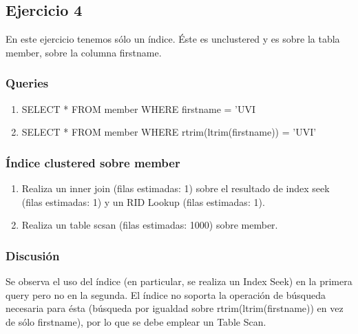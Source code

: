 
\subsection{Ejercicio 4}

En este ejercicio tenemos sólo un índice. Éste es unclustered y es sobre la tabla member, sobre la columna firstname.

\subsubsection{Queries}

\begin{enumerate}[label=(\alph*)]
\item SELECT * FROM member WHERE firstname = ’UVI
\item SELECT * FROM member WHERE rtrim(ltrim(firstname)) = ’UVI’
\end{enumerate}

\subsubsection{Índice clustered sobre member}
\begin{enumerate}[label=(\alph*)]
\item Realiza un inner join (filas estimadas: 1) sobre el resultado de index seek (filas estimadas: 1) y un RID Lookup (filas estimadas: 1).
\item Realiza un table scsan (filas estimadas: 1000) sobre member.
\end{enumerate}

\subsubsection{Discusión}
\par Se observa el uso del índice (en particular, se realiza un Index Seek) en la primera query pero no en la segunda.
El índice no soporta la operación de búsqueda necesaria para ésta (búsqueda por igualdad sobre rtrim(ltrim(firstname)) en vez de sólo firstname), por lo que se debe emplear un Table Scan.
